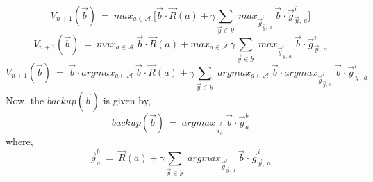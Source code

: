 \documentclass[12pt, draftcls, onecolumn]{IEEEtran}
\begin{document}
\begin{itemize}
\begin{equation*}
            V_{n+1}(\vec{b})\ =\ max_{a \in \mathcal{A}}\ \Big[\vec{b} \cdot \vec{R}(a) + \gamma \sum_{\vec{y} \in \mathcal{Y}}\ max_{\vec{g}_{\vec{y},\ a}^i}\ \vec{b} \cdot \vec{g}_{\vec{y},\ a}^i\Big]
    \end{equation*}
    \begin{equation*}
            V_{n+1}(\vec{b})\ =\ max_{a \in \mathcal{A}}\ \vec{b} \cdot \vec{R}(a) + max_{a \in \mathcal{A}}\ \gamma \sum_{\vec{y} \in \mathcal{Y}}\ max_{\vec{g}_{\vec{y},\ a}^i}\ \vec{b} \cdot \vec{g}_{\vec{y},\ a}^i
    \end{equation*}
    \begin{equation*}
            V_{n+1}(\vec{b})\ =\ \vec{b} \cdot argmax_{a \in \mathcal{A}}\ \vec{b} \cdot \vec{R}(a) + \gamma \sum_{\vec{y} \in \mathcal{Y}}\ argmax_{a \in \mathcal{A}}\ \vec{b} \cdot argmax_{\vec{g}_{\vec{y},\ a}^i}\ \vec{b} \cdot \vec{g}_{\vec{y},\ a}^i
    \end{equation*}
    Now, the $backup(\vec{b})$ is given by,
    \begin{equation}\label{101}
            backup(\vec{b})\ =\ argmax_{\vec{g}_a^b}\ \vec{b} \cdot \vec{g}_a^b
    \end{equation}
    where,
    \[\vec{g}_a^b\ =\ \vec{R}(a) + \gamma \sum_{\vec{y} \in \mathcal{Y}}\ argmax_{\vec{g}_{\vec{y},\ a}^i}\ \vec{b} \cdot \vec{g}_{\vec{y},\ a}^i\]
\end{itemize}
\end{document}
